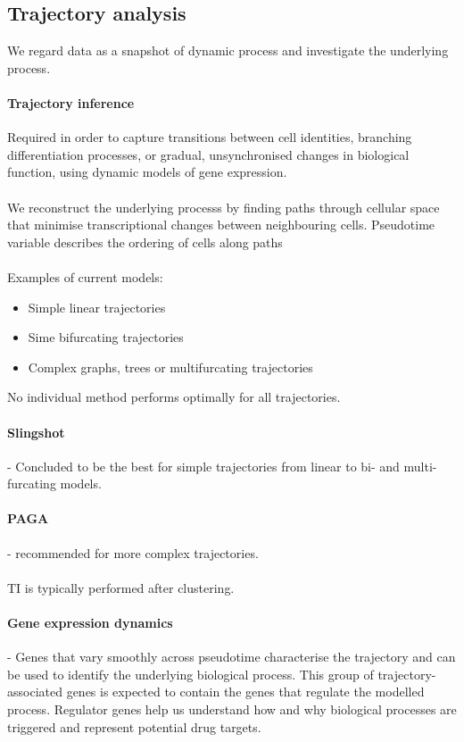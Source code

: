 \documentclass[a4paper,12pt]{article}
\begin{document}
\subsection{Trajectory analysis}
We regard data as a snapshot of  dynamic process and investigate the underlying process. 
\paragraph{Trajectory inference}
Required in order to capture transitions between cell identities, branching differentiation processes, or gradual, unsynchronised changes in biological function, using dynamic models of gene expression.
\paragraph{}
We reconstruct the underlying processs by finding paths through cellular space that minimise transcriptional changes between neighbouring cells. Pseudotime variable describes the ordering of cells along paths
\paragraph{} Examples of current models:
\begin{itemize}
\item Simple linear trajectories
\item Sime bifurcating trajectories
\item Complex graphs, trees or multifurcating trajectories
\end{itemize}
No individual method performs optimally for all trajectories.
\paragraph{Slingshot} - Concluded to be the best for simple trajectories from linear to bi- and multi-furcating models.
\paragraph{PAGA} - recommended for more complex trajectories.
\paragraph{} TI is typically performed after clustering. 

\paragraph{Gene expression dynamics} - Genes that vary smoothly across pseudotime characterise the trajectory and can be used to identify the underlying biological process. This group of trajectory-associated genes is expected to contain the genes that regulate the modelled process. Regulator genes help us understand how and why biological processes are triggered and represent potential drug targets.
\end{document}
